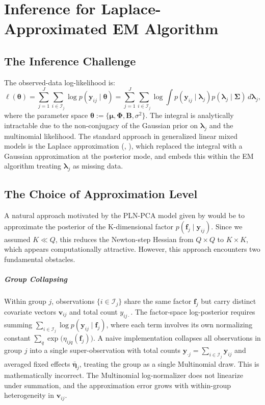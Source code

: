 \documentclass[]{report}
\theoremstyle{definition}
\begin{document}
\chapter{Inference for Laplace-Approximated EM Algorithm}

\section{The Inference Challenge}
    The observed-data log-likelihood is:
\begin{equation}
    \ell(\bm{\theta})=\sum_{j=1}^{J}\sum_{i\in \mathcal{I}_{j}}\log p(\bm{y}_{ij}\mid \bm{\theta})=\sum_{j=1}^{J}\sum_{i\in \mathcal{I}_{j}}\log \int p(\bm{y}_{ij}\mid \bm{\lambda}_{j})p(\bm{\lambda}_{j}\mid \bm{\Sigma})\,d\bm{\lambda}_{j},
\end{equation}
where the parameter space $\bm{\theta}:=\{\bm{\mu}, \bm{\Phi}, \mathbf{B},\sigma^{2}\}$. The integral is analytically intractable due to the non-conjugacy of the Gaussian prior on $\bm{\lambda}_{j}$ and the multinomial likelihood. The standard approach in generalized linear mixed models is the Laplace approximation (\citet{Breslow_1993}, \citet{Tierney01031986}), which replaced the integral with a Gaussian approximation at the posterior mode, and embeds this within the EM algorithm treating $\bm{\lambda}_{j}$ as missing data.

\section{The Choice of Approximation Level}
    A natural approach motivated by the PLN-PCA model given by \citet{chiquet2018variational} would be to approximate the posterior of the K-dimensional factor $p(\mathbf{f}_{j}\mid \bm{y}_{ij})$. Since we assumed $K\ll Q$, this reduces the Newton-step Hessian from $Q\times Q$ to $K\times K$, which appears computationally attractive. However, this approach encounters two fundamental obstacles. 
\paragraph{Group Collapsing} Within group $j$, observations $\{i\in \mathcal{I}_{j}\}$ share the same factor $\mathbf{f}_{j}$ but carry distinct covariate vectors $\bm{v}_{ij}$ and total count $y_{ij\cdot}$. The factor-space log-posterior requires summing $\sum_{i\in \mathcal{I}_{j}}\log p(\bm{y}_{ij}\mid \mathbf{f}_{j})$, where each term involves its own normalizing constant $\sum_q \exp\bigl(\eta_{ijq}(\mathbf{f}_j)\bigr)$. A naive implementation collapses all observations in group $j$ into a single super-observation with total counts $\bm{y}_{\cdot j} = \sum_{i\in \mathcal{I}_{j}} \bm{y}_{ij}$ and averaged fixed effects $\bar{\bm{\eta}}_{j}$, treating the group as a single Multinomial draw. This is mathematically incorrect. The Multinomial log-normalizer does not linearize under summation, and the approximation error grows with within-group heterogeneity in $\bm{v}_{ij}$. 
\end{document}
